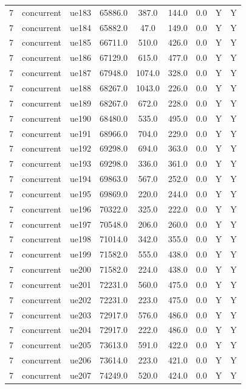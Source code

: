 \begin{table}[ht]
\begin{tabular}{|c|c|c|c|c|c|c|c|c|}
7 & concurrent & ue183 & 65886.0 & 387.0 & 144.0 & 0.0 & Y & Y \\
7 & concurrent & ue184 & 65882.0 & 47.0 & 149.0 & 0.0 & Y & Y \\
7 & concurrent & ue185 & 66711.0 & 510.0 & 426.0 & 0.0 & Y & Y \\
7 & concurrent & ue186 & 67129.0 & 615.0 & 477.0 & 0.0 & Y & Y \\
7 & concurrent & ue187 & 67948.0 & 1074.0 & 328.0 & 0.0 & Y & Y \\
7 & concurrent & ue188 & 68267.0 & 1043.0 & 226.0 & 0.0 & Y & Y \\
7 & concurrent & ue189 & 68267.0 & 672.0 & 228.0 & 0.0 & Y & Y \\
7 & concurrent & ue190 & 68480.0 & 535.0 & 495.0 & 0.0 & Y & Y \\
7 & concurrent & ue191 & 68966.0 & 704.0 & 229.0 & 0.0 & Y & Y \\
7 & concurrent & ue192 & 69298.0 & 694.0 & 363.0 & 0.0 & Y & Y \\
7 & concurrent & ue193 & 69298.0 & 336.0 & 361.0 & 0.0 & Y & Y \\
7 & concurrent & ue194 & 69863.0 & 567.0 & 252.0 & 0.0 & Y & Y \\
7 & concurrent & ue195 & 69869.0 & 220.0 & 244.0 & 0.0 & Y & Y \\
7 & concurrent & ue196 & 70322.0 & 325.0 & 222.0 & 0.0 & Y & Y \\
7 & concurrent & ue197 & 70548.0 & 206.0 & 260.0 & 0.0 & Y & Y \\
7 & concurrent & ue198 & 71014.0 & 342.0 & 355.0 & 0.0 & Y & Y \\
7 & concurrent & ue199 & 71582.0 & 555.0 & 438.0 & 0.0 & Y & Y \\
7 & concurrent & ue200 & 71582.0 & 224.0 & 438.0 & 0.0 & Y & Y \\
7 & concurrent & ue201 & 72231.0 & 560.0 & 475.0 & 0.0 & Y & Y \\
7 & concurrent & ue202 & 72231.0 & 223.0 & 475.0 & 0.0 & Y & Y \\
7 & concurrent & ue203 & 72917.0 & 576.0 & 486.0 & 0.0 & Y & Y \\
7 & concurrent & ue204 & 72917.0 & 222.0 & 486.0 & 0.0 & Y & Y \\
7 & concurrent & ue205 & 73613.0 & 591.0 & 422.0 & 0.0 & Y & Y \\
7 & concurrent & ue206 & 73614.0 & 223.0 & 421.0 & 0.0 & Y & Y \\
7 & concurrent & ue207 & 74249.0 & 520.0 & 424.0 & 0.0 & Y & Y \\

\end{tabular}
\end{table}
